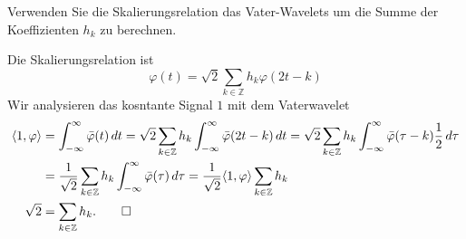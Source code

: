Verwenden Sie die Skalierungsrelation das Vater-Wavelets um die
Summe der Koeffizienten $h_k$ zu berechnen.

\begin{loesung}
Die Skalierungsrelation ist
\[
\varphi(t) = \sqrt{2} \sum_{k\in\mathbb Z} h_k \varphi(2t-k)
\]
Wir analysieren das kosntante Signal $1$ mit dem Vaterwavelet
\begin{align*}
\langle 1,\varphi\rangle
&=
\int_{-\infty}^\infty
\bar{\varphi}(t)\,dt
=
\sqrt{2}
\sum_{k\in\mathbb Z} 
h_k
\int_{-\infty}^\infty
\bar{\varphi}(2t-k)
\,dt
=
\sqrt{2}
\sum_{k\in\mathbb Z} 
h_k
\int_{-\infty}^\infty
\bar{\varphi}(\tau-k)
\frac12
\,d\tau
\\
&=
\frac{1}{\sqrt{2}}
\sum_{k\in\mathbb Z} 
h_k
\int_{-\infty}^\infty
\bar{\varphi}(\tau)
\,d\tau
=
\frac{1}{\sqrt{2}}
\langle 1,\varphi\rangle
\sum_{k\in\mathbb Z} h_k
\\
\sqrt{2}
&=
\sum_{k\in\mathbb Z} h_k.
\qedhere
\end{align*}
\end{loesung}


